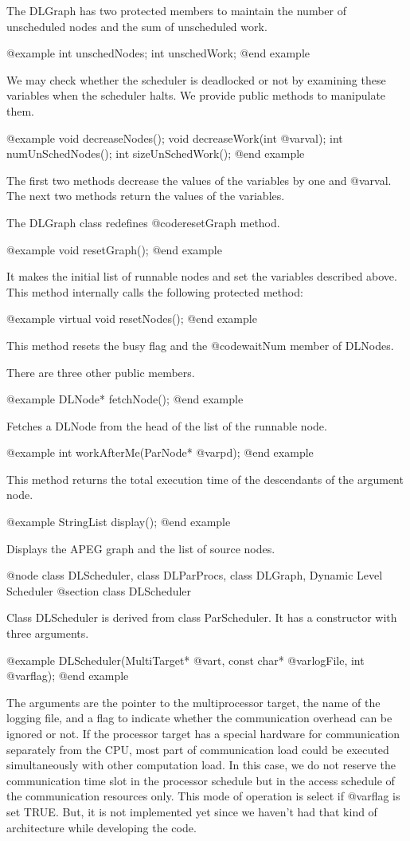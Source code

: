 The DLGraph has two protected members to maintain the number of
unscheduled nodes and the sum of unscheduled work.

@example
int unschedNodes;
int unschedWork;
@end example

We may check whether the scheduler is deadlocked or not by examining these
variables when the scheduler halts. We provide public methods to
manipulate them.

@example
void decreaseNodes();
void decreaseWork(int @var{val});
int numUnSchedNodes();
int sizeUnSchedWork();
@end example

The first two methods decrease the values of the variables by one and
@var{val}. The next two methods return the values of the variables.

The DLGraph class redefines @code{resetGraph} method.

@example
void resetGraph();
@end example

It makes the initial list of runnable nodes and set the variables described
above. This method internally calls the following protected method:

@example
virtual void resetNodes();
@end example

This method resets the busy flag and the @code{waitNum}
member of DLNodes.

There are three other public members.

@example
DLNode* fetchNode();
@end example

Fetches a DLNode from the head of the list of the runnable node.

@example
int workAfterMe(ParNode* @var{pd});
@end example

This method returns the total execution time of the descendants of
the argument node. 

@example
StringList display();
@end example

Displays the APEG graph and the list of source nodes.

@node class DLScheduler, class DLParProcs, class DLGraph, Dynamic Level Scheduler
@section class DLScheduler

Class DLScheduler is derived from class ParScheduler. It has a constructor
with three arguments.

@example
DLScheduler(MultiTarget* @var{t}, const char* @var{logFile}, int @var{flag});
@end example

The arguments are the pointer to the multiprocessor target, the name of the
logging file, and a flag to indicate whether the communication overhead
can be ignored or not. If the processor target has a special hardware for
communication separately from the CPU, most part of communication load
could be executed simultaneously with other computation load. In this case,
we do not reserve the communication time slot in the processor schedule
but in the access schedule of the communication resources only. This mode
of operation is select if @var{flag} is set TRUE. But, it is not
implemented yet since we haven't had that kind of architecture while
developing the code.

